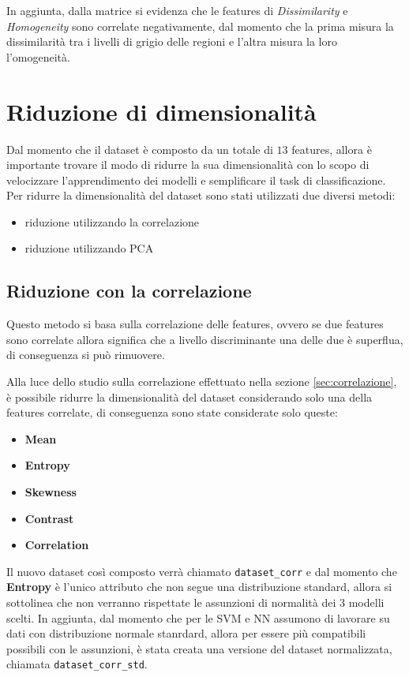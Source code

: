 In aggiunta, dalla matrice si evidenza che le features di \textit{Dissimilarity}
e \textit{Homogeneity} sono correlate negativamente, dal momento che la prima 
misura la dissimilarità tra i livelli di grigio delle regioni e l'altra misura la loro l'omogeneità. 

\section{Riduzione di dimensionalità} \label{sec:riduzone_di_dimensionalità}
Dal momento che il dataset è composto da un totale di $13$ features, allora 
è importante trovare il modo di ridurre la sua dimensionalità con lo scopo di
velocizzare l'apprendimento dei modelli e semplificare il task di classificazione.
Per ridurre la dimensionalità del dataset sono stati utilizzati due diversi metodi:
\begin{itemize}
      \item riduzione utilizzando la correlazione
      \item riduzione utilizzando PCA
\end{itemize}

\subsection{Riduzione con la correlazione} \label{sec:riduzione_correlazione}
Questo metodo si basa sulla correlazione delle features, ovvero se due features 
sono correlate allora significa che a livello discriminante una delle due è superflua,
di conseguenza si può rimuovere.

Alla luce dello studio sulla correlazione effettuato nella sezione \ref{sec:correlazione},
è possibile ridurre la dimensionalità del dataset considerando solo una della 
features correlate, di conseguenza sono state considerate solo queste:
\begin{itemize}
      \item \textbf{Mean}
      \item \textbf{Entropy}
      \item \textbf{Skewness}
      \item \textbf{Contrast}
      \item \textbf{Correlation}
\end{itemize}

Il nuovo dataset così composto verrà chiamato \texttt{dataset\_corr} e dal momento
che \textbf{Entropy} è l'unico attributo che non segue una distribuzione standard,
allora si sottolinea che non verranno rispettate le assunzioni di normalità dei 
$3$ modelli scelti. In aggiunta, dal momento che per le SVM e NN assumono di 
lavorare su dati con distribuzione normale stanrdard, allora per essere più 
compatibili possibili con le assunzioni, è stata creata una versione del dataset
normalizzata, chiamata \texttt{dataset\_corr\_std}. 

